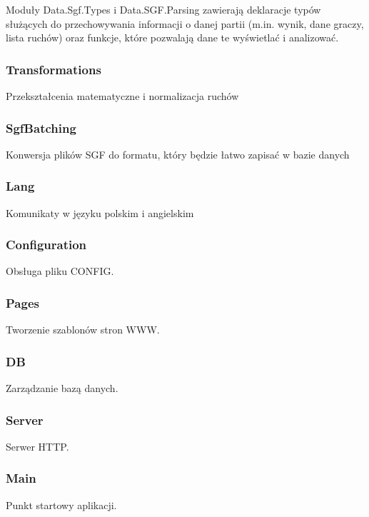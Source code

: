\documentclass[10pt,leqno]{article}
\begin{document}
Moduły Data.Sgf.Types i Data.SGF.Parsing zawierają deklaracje typów służących do 
przechowywania informacji o danej partii (m.in. wynik, dane graczy, lista ruchów) oraz funkcje, które
pozwalają dane te wyświetlać i analizować. 

\subsubsection{Transformations}
Przekształcenia matematyczne i normalizacja ruchów

\subsubsection{SgfBatching}
Konwersja plików SGF do formatu, który będzie łatwo zapisać w bazie danych

\subsubsection{Lang}
Komunikaty w języku polskim i angielskim

\subsubsection{Configuration}
Obsługa pliku CONFIG.

\subsubsection{Pages}
Tworzenie szablonów stron WWW.

\subsubsection{DB}
Zarządzanie bazą danych.

\subsubsection{Server}
Serwer HTTP. 

\subsubsection{Main}
Punkt startowy aplikacji.

\end{document}
